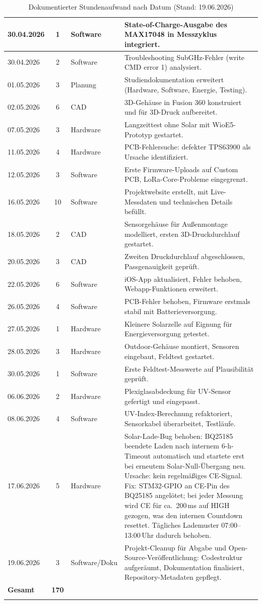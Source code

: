 \documentclass[11pt,a4paper]{scrartcl}
\begin{document}
\begin{longtable}{|l|c|l|p{7cm}|}
30.04.2026 & 1 & Software  & State-of-Charge-Ausgabe des MAX17048 in Messzyklus integriert. \\ \hline
30.04.2026 & 2 & Software  & Troubleshooting SubGHz-Fehler (write CMD error 1) analysiert. \\ \hline
01.05.2026 & 3 & Planung   & Studiendokumentation erweitert (Hardware, Software, Energie, Testing). \\ \hline
02.05.2026 & 6 & CAD       & 3D-Gehäuse in Fusion 360 konstruiert und für 3D-Druck aufbereitet. \\ \hline
07.05.2026 & 3 & Hardware  & Langzeittest ohne Solar mit WioE5-Prototyp gestartet. \\ \hline
11.05.2026 & 4 & Hardware  & PCB-Fehlersuche: defekter TPS63900 als Ursache identifiziert. \\ \hline
12.05.2026 & 3 & Software  & Erste Firmware-Uploads auf Custom PCB, LoRa-Core-Probleme eingegrenzt. \\ \hline
16.05.2026 & 10 & Software & Projektwebsite erstellt, mit Live-Messdaten und technischen Details befüllt. \\ \hline
18.05.2026 & 2 & CAD       & Sensorgehäuse für Außenmontage modelliert, ersten 3D-Druckdurchlauf gestartet. \\ \hline
20.05.2026 & 3 & CAD       & Zweiten Druckdurchlauf abgeschlossen, Passgenauigkeit geprüft. \\ \hline
22.05.2026 & 6 & Software  & iOS-App aktualisiert, Fehler behoben, Webapp-Funktionen erweitert. \\ \hline
26.05.2026 & 4 & Software  & PCB-Fehler behoben, Firmware erstmals stabil mit Batterieversorgung. \\ \hline
27.05.2026 & 1 & Hardware  & Kleinere Solarzelle auf Eignung für Energieversorgung getestet. \\ \hline
28.05.2026 & 3 & Hardware  & Outdoor-Gehäuse montiert, Sensoren eingebaut, Feldtest gestartet. \\ \hline
30.05.2026 & 1 & Software  & Erste Feldtest-Messwerte auf Plausibilität geprüft. \\ \hline
06.06.2026 & 2 & Hardware  & Plexiglasabdeckung für UV-Sensor gefertigt und eingepasst. \\ \hline
08.06.2026 & 4 & Software  & UV-Index-Berechnung refaktoriert, Sensorkabel überarbeitet, Testläufe. \\ \hline
17.06.2026 & 5 & Hardware  & Solar-Lade-Bug behoben: BQ25185 beendete Laden nach internem 6-h-Timeout automatisch und startete erst bei erneutem Solar-Null-Übergang neu. Ursache: kein regelmäßiges CE-Signal. Fix: STM32-GPIO an CE-Pin des BQ25185 angelötet; bei jeder Messung wird CE für ca.~200\,ms auf HIGH gezogen, was den internen Countdown resettet. Tägliches Lademuster 07:00--13:00\,Uhr dadurch behoben. \\ \hline
19.06.2026 & 3 & Software/Doku & Projekt-Cleanup für Abgabe und Open-Source-Veröffentlichung: Codestruktur aufgeräumt, Dokumentation finalisiert, Repository-Metadaten gepflegt. \\ \hline
\textbf{Gesamt} & \textbf{170} & & \\ \hline
\caption{Dokumentierter Stundenaufwand nach Datum (Stand: 19.06.2026)}
\end{longtable}
\normalsize
\end{document}
